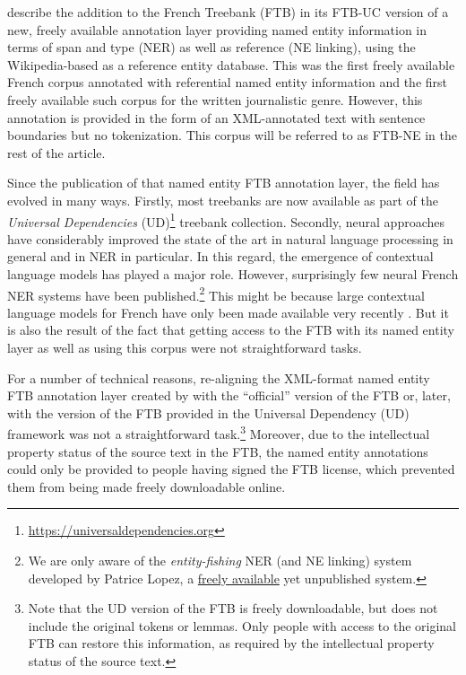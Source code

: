  describe the addition to the French Treebank (FTB) \citep{abeille-etal-2003-building} in its FTB-UC version \citep{candito-etal-2010-statistical} of a new, freely available annotation layer providing named entity information in terms of span and type (NER) as well as reference (NE linking), using the Wikipedia-based \aleda \cite{sagot-stern-2012-aleda} as a reference entity database. This was the first freely available French corpus annotated with referential named entity information and the first freely available such corpus for the written journalistic genre. However, this annotation is provided in the form of an XML-annotated text with sentence boundaries but no tokenization. This corpus will be referred to as FTB-NE in the rest of the article.

Since the publication of that named entity FTB annotation layer, the field has evolved in many ways. Firstly, most treebanks are now available as part of the \emph{Universal Dependencies} (UD)\footnote{\url{https://universaldependencies.org}} treebank collection. Secondly, neural approaches have considerably improved the state of the art in natural language processing in general and in NER in particular. In this regard, the emergence of contextual language models has played a major role. However, surprisingly few neural French NER systems have been published.\footnote{We are only aware of the \emph{entity-fishing} NER (and NE linking) system developed by Patrice Lopez, a \href{https://github.com/kermitt2/entity-fishing}{freely available} yet unpublished system.} This might be because large contextual language models for French have only been made available very recently \cite{martin-etal-2020-camembert}. But it is also the result of the fact that getting access to the FTB with its named entity layer as well as using this corpus were not straightforward tasks. 

For a number of technical reasons, re-aligning the XML-format named entity FTB annotation layer created by  with the ``official'' version of the FTB or, later, with the version of the FTB provided in the Universal Dependency (UD) framework was not a straightforward task.\footnote{Note that the UD version of the FTB is freely downloadable, but does not include the original tokens or lemmas. Only people with access to the original FTB can restore this information, as required by the  intellectual property status of the source text.} Moreover, due to the intellectual property status of the source text in the FTB, the named entity annotations could only be provided to people having signed the FTB license, which prevented them from being made freely downloadable online.

